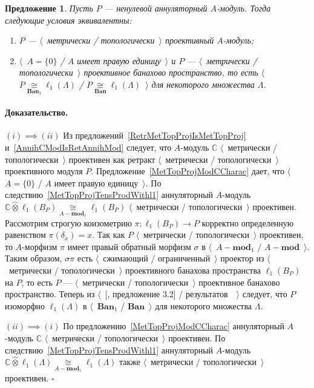 \documentclass[12pt]{article}
\newcommand{\projtens}{\mathbin{\widehat{\otimes}}}
\newcommand{\isom}[1]{\mathop{\mathbin{\cong}}\limits_{#1}}
\newtheorem{proposition}[theorem]{Предложение}
\renewenvironment{proof}{\paragraph{Доказательство.}}{\hfill$\square$\medskip}
\begin{document}
\begin{proposition}\label{MetTopProjOfAnnihModCharac} Пусть $P$ --- ненулевой
    аннуляторный $A$-модуль. Тогда следующие условия эквивалентны:
    \begin{enumerate}[label = (\roman*)]
        \item $P$ --- $\langle$~метрически / топологически~$\rangle$ проективный
              $A$-модуль;

        \item $\langle$~$A= \{0 \}$ / $A$ имеет 
              правую единицу~$\rangle$ и 
              $P$ --- $\langle$~метрически / топологически~$\rangle$ 
              проективное банахово пространство, то есть 
              $\langle$~$P\isom{\mathbf{Ban}_1}\ell_1(\Lambda)$ /
              $P\isom{\mathbf{Ban}}\ell_1(\Lambda)$~$\rangle$ 
              для некоторого множества $\Lambda$.
    \end{enumerate}

\end{proposition}
\begin{proof} $(i) \implies  (ii)$ Из
    предложений~\ref{RetrMetTopProjIsMetTopProj}
    и~\ref{AnnihCModIsRetAnnihMod} следует, что $A$-модуль $\mathbb{C}$
    $\langle$~метрически / топологически~$\rangle$ проективен как
    ретракт $\langle$~метрически / топологически~$\rangle$ проективного
    модуля $P$. Предложение~\ref{MetTopProjModCCharac} дает, что
    $\langle$~$A= \{0 \}$ / $A$ имеет правую единицу~$\rangle$.  По
    следствию~\ref{MetTopProjTensProdWithl1} аннуляторный $A$-модуль
    $\mathbb{C}\projtens\ell_1(B_P)\isom{A-\mathbf{mod}_1}\ell_1(B_P)$
    $\langle$~метрически / топологически~$\rangle$ проективен.
    Рассмотрим строгую коизометрию $\pi:\ell_1(B_P)\to P$ корректно
    определенную равенством $\pi(\delta_x)=x$. Так как $P$
    $\langle$~метрически / топологически~$\rangle$ проективен, то
    $A$-морфизм $\pi$ имеет правый обратный морфизм $\sigma$ в
    $\langle$~$A-\mathbf{mod}_1$ / $A-\mathbf{mod}$~$\rangle$. Таким
    образом, $\sigma\pi$ есть $\langle$~сжимающий /
    ограниченный~$\rangle$ проектор из $\langle$~метрически /
    топологически~$\rangle$ проективного банахова пространства
    $\ell_1(B_P)$ на $P$, то есть $P$ --- $\langle$~метрически /
    топологически~$\rangle$ проективное банахово пространство. Теперь из
    $\langle$~[\cite{HelMetrFrQMod}, предложение 3.2] /
    результатов~\cite{KotheTopProjBanSp}~$\rangle$ следует, что $P$
    изоморфно $\ell_1(\Lambda)$ в $\langle$~$\mathbf{Ban}_1$ /
    $\mathbf{Ban}$~$\rangle$ для некоторого множества $\Lambda$.

    $(ii)\implies (i)$ По предложению~\ref{MetTopProjModCCharac}
    аннуляторный $A$-модуль $\mathbb{C}$ $\langle$~метрически /
    топологически~$\rangle$ проективен. По
    следствию~\ref{MetTopProjTensProdWithl1} аннуляторный $A$-модуль
    $\mathbb{C}\projtens\ell_1(\Lambda)\isom{A-\mathbf{mod}_1}\ell_1(\Lambda)$
    также $\langle$~метрически / топологически~$\rangle$ проективен.
\end{proof}
\end{document}
